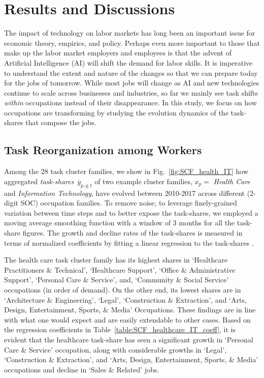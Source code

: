 \documentclass[letterpaper]{article} %
\begin{document}
\section{Results and Discussions}
\label{sec:results}
%
The impact of technology on labor markets has long been an important issue for economic theory, empirics, and policy. Perhaps even more important to those that make up the labor market employers and employees is that the advent of Artificial Intelligence (AI) will shift the demand for labor skills. It is imperative to understand the extent and nature of the changes so that we can prepare today for the jobs of tomorrow. While most jobs will change as AI and new technologies continue to scale across businesses and industries, so far we mainly see task shifts \textit{within} occupations instead of their disappearance. In this study, we focus on how occupations are transforming by studying the evolution dynamics of the task-shares that compose the jobs.

\subsection{Task Reorganization among Workers}
\label{subsec:res_task_reorg}
Among the 28 task cluster families, we show in Fig.~\ref{fig:SCF_health_IT} how aggregated \emph{task-shares}~$\overline{y}_{p,q,t}$ of two example cluster families, $x_p = $ \emph{Health Care} and \emph{Information Technology}, have evolved between 2010-2017 across different (2-digit SOC) occupation families. To remove noise, to leverage finely-grained variation between time steps and to better expose the task-shares, we employed a moving average smoothing function with a window of 3 months for all the task-share figures. The growth and decline rates of the task-shares is measured in terms of normalized coefficients by fitting a linear regression to the task-shares \cite{bishop2006pattern}. 

The health care task cluster family has its highest shares in `Healthcare Practitioners \& Technical', `Healthcare Support', `Office \& Administrative Support', `Personal Care \& Service', and, `Community \& Social Service' occupations (in order of demand). On the other end, its lowest shares are in `Architecture \& Engineering', `Legal', `Construction \& Extraction', and `Arts, Design, Entertainment, Sports, \& Media' Occupations. These findings are in line with what one would expect and are easily extendable to other cases. Based on the regression coefficients in Table~\ref{table:SCF_healthcare_IT_coeff}, it is evident that the healthcare task-share has seen a significant growth in `Personal Care \& Service' occupation, along with considerable growths in `Legal', `Construction \& Extraction', and `Arts, Design, Entertainment, Sports, \& Media' occupations and decline in `Sales \& Related' jobs.
\end{document}
